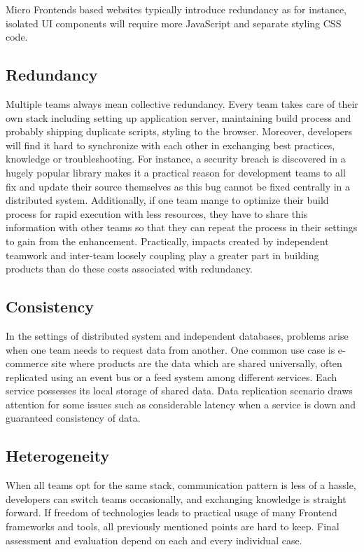 \documentclass[a4paper]{book}
\begin{document}
Micro Frontends based websites typically introduce redundancy as for instance, isolated UI components will require more JavaScript and separate styling CSS code.

\subsection{Redundancy}

Multiple teams always mean collective redundancy. Every team takes care of their own stack including setting up application server, maintaining build process and probably shipping duplicate scripts, styling to the browser. Moreover, developers will find it hard to synchronize with each other in exchanging best practices, knowledge or troubleshooting. For instance, a security breach is discovered in a hugely popular library makes it a practical reason for development teams to all fix and update their source themselves as this bug cannot be fixed centrally in a distributed system. Additionally, if one team mange to optimize their build process for rapid execution with less resources, they have to share this information with other teams so that they can repeat the process in their settings to gain from the enhancement. Practically, impacts created by independent teamwork and inter-team loosely coupling play a greater part in building products than do these costs associated with redundancy. \cite{Gee20}

\subsection{Consistency}
 
In the settings of distributed system and independent databases, problems arise when one team needs to request data from another. One common use case is e-commerce site where products are the data which are shared universally, often replicated using an event bus or a feed system among different services. Each service possesses its local storage of shared data. Data replication scenario draws attention for some issues such as considerable latency when a service is down and guaranteed consistency of data. \cite{Gee20}

\subsection{Heterogeneity}

When all teams opt for the same stack, communication pattern is less of a hassle, developers can switch teams occasionally, and exchanging knowledge is straight forward. If freedom of technologies leads to practical usage of many Frontend frameworks and tools, all previously mentioned points are hard to keep. Final assessment and evaluation depend on each and every individual case. \cite{Gee20}
\end{document}
